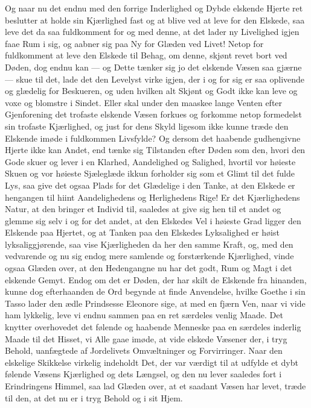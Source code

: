 \documentclass[12pt,a4paper]{book}
\newcommand{\apage}[1]{\marginnote{\footnotesize\textit{[#1]}}}
\begin{document}
Og naar nu det endnu med den forrige Inderlighed og Dybde elskende Hjerte
ret beslutter at holde sin Kjærlighed fast og at blive ved at leve for
den Elskede, saa leve det da saa fuldkomment for og med denne, at det
lader ny Livelighed igjen faae Rum i sig, og aabner sig paa Ny for Glæden
ved Livet! Netop for fuldkomment at leve den Elskede til Behag, om denne,
skjønt revet bort ved Døden, dog endnu kan --- og Dette tænker sig jo det
elskende Væsen saa gjærne --- skue til det, lade det den Levelyst virke
igjen, der i og for sig er saa oplivende og glædelig for Beskueren, og
uden hvilken alt Skjønt og Godt ikke kan leve og voxe og blomstre i
Sindet. Eller skal under den maaskee lange Venten efter Gjenforening det
trofaste elskende Væsen forkues og forkomme netop formedelst sin trofaste
Kjærlighed, og just for dens Skyld ligesom ikke kunne træde den Elskende
imøde i fuldkommen Livsfylde? Og dersom det haabende gudhengivne Hjerte
ikke kan Andet, end tænke sig Tilstanden efter Døden som den, hvori den
Gode skuer og lever i en Klarhed, Aandelighed og Salighed, hvortil vor
høieste Skuen og vor høieste Sjæleglæde ikkun forholder sig som et Glimt
til det fulde Lys, saa give det ogsaa Plads for det Glædelige i den Tanke,
at den Elskede er hengangen til hiint Aandelighedens og Herlighedens
Rige! Er det \apage{170} Kjærlighedens Natur, at den bringer et Individ til, saaledes
at give sig hen til et andet og glemme sig selv i og for det andet, at den
Elskedes Vel i høieste Grad ligger den Elskende paa Hjertet, og at Tanken
paa den Elskedes Lyksalighed er høist lyksaliggjørende, saa vise
Kjærligheden da her den samme Kraft, og, med den vedvarende og nu sig
endog mere samlende og forstærkende Kjærlighed, vinde ogsaa Glæden over,
at den Hedengangne nu har det godt, Rum og Magt i det elskende Gemyt.
Endog om det er Døden, der har skilt de Elskende fra hinanden, kunne dog
efterhaanden de Ord begynde at finde Anvendelse, hvilke Goethe i sin
Tasso lader den ædle Prindsesse Eleonore sige, at med en fjærn Ven, naar
vi vide ham lykkelig, leve vi endnu sammen paa en ret særdeles venlig
Maade. Det knytter overhovedet det følende og haabende Menneske paa en
særdeles inderlig Maade til det Hisset, vi Alle gaae imøde, at vide
elskede Væsener der, i tryg Behold, uanfægtede af Jordelivets
Omvæltninger og Forvirringer. Naar den elskelige Skikkelse virkelig
indeholdt Det, der var værdigt til at udfylde et dybt følende Væsens
Kjærlighed og dets Længsel, og den nu lever saaledes fort i Erindringens
Himmel, saa lad Glæden over, at et saadant Væsen har levet, træde til
den, at det nu er i tryg Behold og i sit Hjem.
\end{document}
